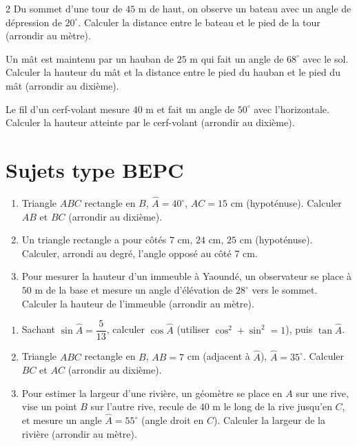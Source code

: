 \begin{multicols}{2}
\exo{} Du sommet d'une tour de $45$ m de haut, on observe un bateau avec un angle
de dépression de $20^{\circ}$. Calculer la distance entre le bateau et le pied de la tour
(arrondir au mètre).

\exo{} Un mât est maintenu par un hauban de $25$ m qui fait un angle de
$68^{\circ}$ avec le sol. Calculer la hauteur du mât et la distance entre le pied du hauban
et le pied du mât (arrondir au dixième).

\exo{} Le fil d'un cerf-volant mesure $40$ m et fait un angle de $50^{\circ}$ avec
l'horizontale. Calculer la hauteur atteinte par le cerf-volant (arrondir au dixième).

\end{multicols}

\section{Sujets type BEPC}

\begin{enumerate}[label=\arabic*)]
\item Triangle $ABC$ rectangle en $B$, $\widehat A=40^{\circ}$, $AC=15$ cm (hypoténuse).
Calculer $AB$ et $BC$ (arrondir au dixième).
\item Un triangle rectangle a pour côtés $7$ cm, $24$ cm, $25$ cm (hypoténuse). Calculer,
arrondi au degré, l'angle opposé au côté $7$ cm.
\item Pour mesurer la hauteur d'un immeuble à Yaoundé, un observateur se place à $50$ m de
la base et mesure un angle d'élévation de $28^{\circ}$ vers le sommet. Calculer la hauteur
de l'immeuble (arrondir au mètre).
\end{enumerate}

\begin{enumerate}[label=\arabic*)]
\item Sachant $\sin\widehat A=\dfrac5{13}$, calculer $\cos\widehat A$ (utiliser
$\cos^{2}+\sin^{2}=1$), puis $\tan\widehat A$.
\item Triangle $ABC$ rectangle en $B$, $AB=7$ cm (adjacent à $\widehat A$),
$\widehat A=35^{\circ}$. Calculer $BC$ et $AC$ (arrondir au dixième).
\item Pour estimer la largeur d'une rivière, un géomètre se place en $A$ sur une rive,
vise un point $B$ sur l'autre rive, recule de $40$ m le long de la rive jusqu'en $C$, et
mesure un angle $\widehat A=55^{\circ}$ (angle droit en $C$). Calculer la largeur de la
rivière (arrondir au mètre).
\end{enumerate}

